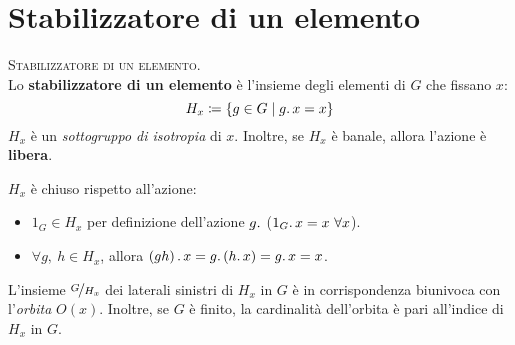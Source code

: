 \section{Stabilizzatore di un elemento}
\begin{define}\textsc{Stabilizzatore di un elemento.}\\
Lo \textbf{stabilizzatore di un elemento} è l'insieme degli elementi di $G$ che fissano $x$:
\begin{equation}
H_x\coloneqq \left\{g\in G\mid g\ldotp x = x\right\}
\end{equation}
$H_x$ è un \textit{sottogruppo di isotropia} di $x$. Inoltre, se $H_x$ è banale, allora l'azione è \textbf{libera}.
\end{define}
\begin{demonstration} $H_x$ è chiuso rispetto all'azione:
	\begin{itemize}
		\item $1_G\in H_x$ per definizione dell'azione $g\ldotp$ ($1_G\ldotp x=x\ \forall x$).
		\item $\forall g,\ h\in H_x$, allora $\left(gh\right)\ldotp x=g\ldotp \left(h\ldotp x\right)=g\ldotp x=x$.
	\end{itemize}
\vspace{-3mm}
\end{demonstration}
\begin{observe}
L'insieme $\nicefrac{G}{H_x}$ dei laterali sinistri di $H_x$ in $G$ è in corrispondenza biunivoca con l'\textit{orbita} $O\left(x\right)$. Inoltre, se $G$ è finito, la cardinalità dell'orbita è pari all'indice di $H_x$ in $G$.
\end{observe}
